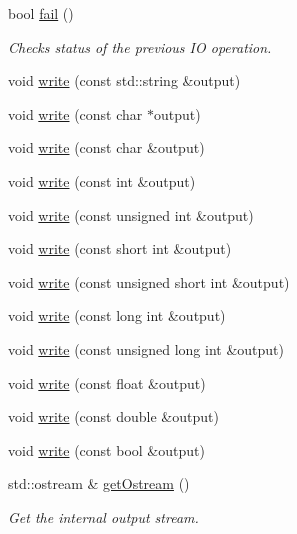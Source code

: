 \begin{DoxyCompactItemize}
bool \mbox{\hyperlink{classENSEM_1_1TextWriter_a924bbfa5f3bd8f1dbb3f856b1db8b9be}{fail}} ()
\begin{DoxyCompactList}\small\item\em Checks status of the previous IO operation. \end{DoxyCompactList}\item 
void \mbox{\hyperlink{classENSEM_1_1TextWriter_a46f85ca8047ad9b0419c1f8e40847b52}{write}} (const std\+::string \&output)
\item 
void \mbox{\hyperlink{classENSEM_1_1TextWriter_ae8a8946f8f52884017f52cd69f809ba2}{write}} (const char $\ast$output)
\item 
void \mbox{\hyperlink{classENSEM_1_1TextWriter_aef9f6c18d6d6995fadc116b65e58b35a}{write}} (const char \&output)
\item 
void \mbox{\hyperlink{classENSEM_1_1TextWriter_a833d3d5526cb2f48b0674df3635f7bf3}{write}} (const int \&output)
\item 
void \mbox{\hyperlink{classENSEM_1_1TextWriter_aeca2b6ad3ab9353c98220345c8f8edfe}{write}} (const unsigned int \&output)
\item 
void \mbox{\hyperlink{classENSEM_1_1TextWriter_af8e02d2f0ce493c50698a7999af9596c}{write}} (const short int \&output)
\item 
void \mbox{\hyperlink{classENSEM_1_1TextWriter_a7c3f545361114dcb952b07151188c18c}{write}} (const unsigned short int \&output)
\item 
void \mbox{\hyperlink{classENSEM_1_1TextWriter_a2bf45b3cde030d81948d6b13e5c76437}{write}} (const long int \&output)
\item 
void \mbox{\hyperlink{classENSEM_1_1TextWriter_ab619ef20f83f064bddb2ba4e5ab2b9dc}{write}} (const unsigned long int \&output)
\item 
void \mbox{\hyperlink{classENSEM_1_1TextWriter_a7209fb322f222a9d7354a0b03bc2c61c}{write}} (const float \&output)
\item 
void \mbox{\hyperlink{classENSEM_1_1TextWriter_af276971ecba157a3867e53ec909e543f}{write}} (const double \&output)
\item 
void \mbox{\hyperlink{classENSEM_1_1TextWriter_a3e99ec247c2bd70e5b4361bbb0264daf}{write}} (const bool \&output)
\item 
std\+::ostream \& \mbox{\hyperlink{classENSEM_1_1TextWriter_a40ade2e6c44ba267efdce5fb70909362}{get\+Ostream}} ()
\begin{DoxyCompactList}\small\item\em Get the internal output stream. \end{DoxyCompactList}\item 

\end{DoxyCompactItemize}
